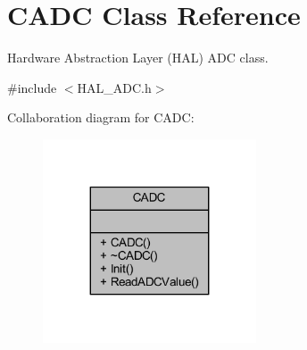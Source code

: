 \hypertarget{class_c_a_d_c}{}\section{C\+A\+DC Class Reference}
\label{class_c_a_d_c}


Hardware Abstraction Layer (H\+AL) A\+DC class.  




{\ttfamily \#include $<$H\+A\+L\+\_\+\+A\+D\+C.\+h$>$}



Collaboration diagram for C\+A\+DC\+:
\nopagebreak
\begin{figure}[H]
\begin{center}
\leavevmode
\includegraphics[width=179pt]{class_c_a_d_c__coll__graph}
\end{center}
\end{figure}
